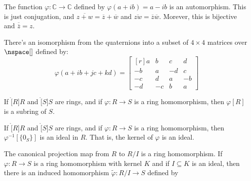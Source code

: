 \documentclass{article}                                                        %
\begin{document}
                \begin{example}
                    The function $\varphi:\mathbb{C}\rightarrow\mathbb{C}$
                    defined by $\varphi(a+ib)=a-ib$ is an automorphism. This is
                    just conjugation, and
                    $\overline{z+w}=\overline{z}+\overline{w}$ and
                    $\overline{zw}=\overline{z}\overline{w}$. Morever, this is
                    bijective and $\overline{\overline{z}}=z$.
                \end{example}
                \begin{example}
                    There's an isomorphism from the quaternions into a subset of
                    $4\times{4}$ matrices over $\nspace[]$ defined by:
                    \begin{equation}
                        \varphi(a+ib+jc+kd)=
                        \begin{bmatrix*}[r]
                            a&b&c&d\\
                            \minus{b}&a&\minus{d}&c\\
                            \minus{c}&d&a&\minus{b}\\
                            \minus{d}&\minus{c}&b&a
                        \end{bmatrix*}
                    \end{equation}
                \end{example}
                \begin{theorem}
                    If $\ring[R]{R}$ and $\ring[S]{S}$ are rings, and if
                    $\varphi:R\rightarrow{S}$ is a ring homomorphism, then
                    $\varphi[R]$ is a subring of $S$.
                \end{theorem}
                \begin{theorem}
                    If $\ring[R]{R}$ and $\ring[S]{S}$ are rings, and if
                    $\varphi:R\rightarrow{S}$ is a ring homomorphism, then
                    $\varphi^{\minus{1}}[\{0_{S}\}]$ is an ideal in $R$. That
                    is, the kernel of $\varphi$ is an ideal.
                \end{theorem}
                The canonical projection map from $R$ to $R/I$ is a ring
                homomorphism. If $\varphi:R\rightarrow{S}$ is a ring
                homomorphism with kernel $K$ and if $I\subseteq{K}$ is an ideal,
                then there is an induced homomorphism
                $\tilde{\varphi}:R/I\rightarrow{S}$ defined by
\end{document}
